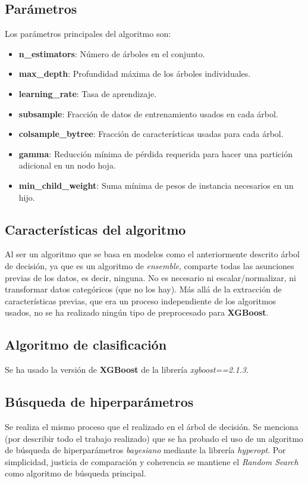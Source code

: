 \documentclass[12pt,letterpaper]{article}
\begin{document}
\subsection{Parámetros}
Los parámetros principales del algoritmo son:
\begin{itemize}
    \item \textbf{n\_estimators}: Número de árboles en el conjunto.
    \item \textbf{max\_depth}: Profundidad máxima de los árboles individuales. 
    \item \textbf{learning\_rate}: Tasa de aprendizaje.
    \item \textbf{subsample}: Fracción de datos de entrenamiento usados en cada árbol.
    \item \textbf{colsample\_bytree}: Fracción de características usadas para cada árbol. 
    \item \textbf{gamma}: Reducción mínima de pérdida requerida para hacer una partición adicional en un nodo hoja.
    \item \textbf{min\_child\_weight}: Suma mínima de pesos de instancia necesarios en un hijo.
\end{itemize}

\subsection{Características del algoritmo}
Al ser un algoritmo que se basa en modelos como el anteriormente descrito árbol de decisión, ya que es un algoritmo de \textit{ensemble}, comparte todas las asunciones previas de los datos, es decir, ninguna. No es necesario ni escalar/normalizar, ni transformar datos categóricos (que no los hay). Más allá de la extracción de características previas, que era un proceso independiente de los algoritmos usados, no se ha realizado ningún tipo de preprocesado para \textbf{XGBoost}.

\subsection{Algoritmo de clasificación}
Se ha usado la versión de \textbf{XGBoost} de la librería \textit{xgboost==2.1.3}.

\subsection{Búsqueda de hiperparámetros}
Se realiza el mismo proceso que el realizado en el árbol de decisión. Se menciona (por describir todo el trabajo realizado) que se ha probado el uso de un algoritmo de búsqueda de hiperparámetros \textit{bayesiano} mediante la librería \textit{hyperopt}. Por simplicidad, justicia de comparación y coherencia se mantiene el \textit{Random Search} como algoritmo de búsqueda principal.
\end{document}
